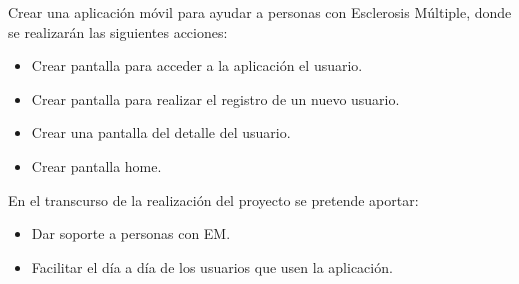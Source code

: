 

Crear una aplicación móvil para ayudar a personas con Esclerosis Múltiple, donde se realizarán las siguientes acciones:
\begin{itemize}
	\item Crear pantalla para acceder a la aplicación el usuario.
	\item Crear pantalla para realizar el registro de un nuevo usuario.
	\item Crear una pantalla del detalle del usuario.
	\item Crear pantalla home.
\end{itemize}

En el transcurso de la realización del proyecto se pretende aportar:
\begin{itemize}
	\item Dar soporte a personas con EM.
	\item Facilitar el día a día de los usuarios que usen la aplicación.
\end{itemize}


